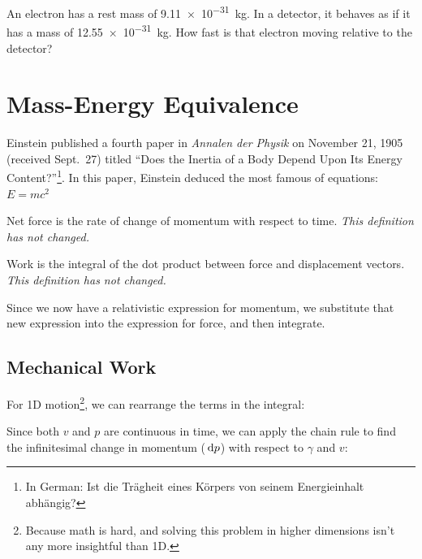 \begin{example}
  An electron has a rest mass of \SI{9.11e-31}{\kilo\gram}. In a detector, it
  behaves as if it has a mass of \SI{12.55e-31}{\kilo\gram}. How fast is that
  electron moving relative to the detector?
\end{example}


\section{Mass-Energy Equivalence}

Einstein published a fourth paper in \emph{Annalen der Physik} on November
21, 1905 (received Sept.\ 27) titled ``Does the Inertia of a Body Depend Upon
Its Energy Content?''\footnote{In German: Ist die Tr\"{a}gheit eines
K\"{o}rpers von seinem Energieinhalt abh\"{a}ngig?}. In this paper, Einstein
deduced the most famous of equations: $E=mc^2$

Net force is the rate of change of momentum with respect to time. \emph{This
definition has not changed.}


Work is the integral of the dot product between force and displacement
vectors. \emph{This definition has not changed.}


Since we now have a relativistic expression for momentum, we substitute that
new expression into the expression for force, and then integrate.




\subsection{Mechanical Work}
For 1D motion\footnote{Because math is hard, and solving this problem in
higher dimensions isn't any more insightful than 1D.}, we can rearrange the
terms in the integral:

%  
Since both $v$ and $p$ are continuous in time, we can apply the chain rule to
find the infinitesimal change in momentum ($\dl p$) with respect to $\gamma$
and $v$:
  
